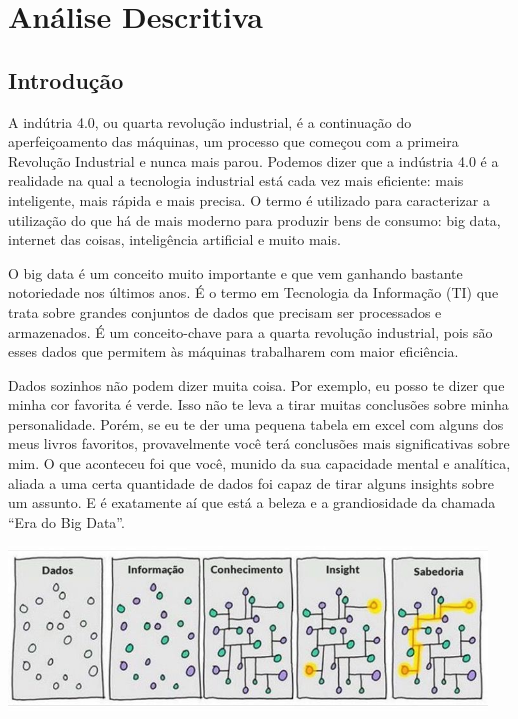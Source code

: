 \documentclass[
]{book}
\begin{document}
\hypertarget{analise_descritiva}{%
\chapter{Análise Descritiva}\label{analise_descritiva}}

\hypertarget{introduuxe7uxe3o}{%
\section{Introdução}\label{introduuxe7uxe3o}}

A indútria 4.0, ou quarta revolução industrial, é a continuação do aperfeiçoamento das máquinas, um processo que começou com a primeira Revolução Industrial e nunca mais parou. Podemos dizer que a indústria 4.0 é a realidade na qual a tecnologia industrial está cada vez mais eficiente: mais inteligente, mais rápida e mais precisa. O termo é utilizado para caracterizar a utilização do que há de mais moderno para produzir bens de consumo: big data, internet das coisas, inteligência artificial e muito mais.

O big data é um conceito muito importante e que vem ganhando bastante notoriedade nos últimos anos. É o termo em Tecnologia da Informação (TI) que trata sobre grandes conjuntos de dados que precisam ser processados e armazenados. É um conceito-chave para a quarta revolução industrial, pois são esses dados que permitem às máquinas trabalharem com maior eficiência.

Dados sozinhos não podem dizer muita coisa. Por exemplo, eu posso te dizer que minha cor favorita é verde. Isso não te leva a tirar muitas conclusões sobre minha personalidade. Porém, se eu te der uma pequena tabela em excel com alguns dos meus livros favoritos, provavelmente você terá conclusões mais significativas sobre mim. O que aconteceu foi que você, munido da sua capacidade mental e analítica, aliada a uma certa quantidade de dados foi capaz de tirar alguns insights sobre um assunto. E é exatamente aí que está a beleza e a grandiosidade da chamada ``Era do Big Data''.

\includegraphics[width=5in]{dados_sabedoria}
\end{document}
